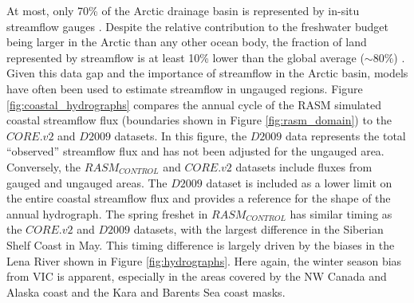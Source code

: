 \documentclass[jgrga, draft]{agutex}
\begin{document}
\begin{article}
At most, only 70\% of the Arctic drainage basin is represented by in-situ streamflow gauges \citep{Shiklomanov_2000}.
Despite the relative contribution to the freshwater budget being larger in the Arctic than any other ocean body, the fraction of land represented by streamflow is at least 10\% lower than the global average ($\sim 80\%$) \citep{Dai_2009}.
Given this data gap and the importance of streamflow in the Arctic basin, models have often been used to estimate streamflow in ungauged regions.
Figure \ref{fig:coastal_hydrographs} compares the annual cycle of the RASM simulated coastal streamflow flux (boundaries shown in Figure \ref{fig:rasm_domain}) to the $CORE.v2$ and $D2009$ datasets.
In this figure, the $D2009$ data represents the total ``observed'' streamflow flux and has not been adjusted for the ungauged area.
Conversely, the $RASM_{CONTROL}$ and $CORE.v2$ datasets include fluxes from gauged and ungauged areas.
The $D2009$ dataset is included as a lower limit on the entire coastal streamflow flux and provides a reference for the shape of the annual hydrograph.
The spring freshet in $RASM_{CONTROL}$ has similar timing as the $CORE.v2$ and $D2009$ datasets, with the largest difference in the Siberian Shelf Coast in May.
This timing difference is largely driven by the biases in the Lena River shown in Figure \ref{fig:hydrographs}.
Here again, the winter season bias from VIC is apparent, especially in the areas covered by the NW Canada and Alaska coast and the Kara and Barents Sea coast masks.


\end{article}
\end{document}
